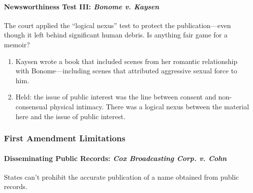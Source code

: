 \paragraph{Newsworthiness Test III: \emph{Bonome v. Kaysen}}

The court applied the ``logical nexus'' test to protect the publication---even 
though it left behind significant human debris. Is anything fair game for a 
memoir?

\begin{enumerate}
    \item Kaysen wrote a book that included scenes from her romantic 
    relationship with Bonome---including scenes that attributed aggressive 
    sexual force to him.
    \item Held: the issue of public interest was the line between consent and 
    non-consensual physical intimacy. There was a logical nexus between the 
    material here and the issue of public interest.
\end{enumerate}

\subsubsection{First Amendment Limitations}

\paragraph{Disseminating Public Records: \emph{Cox Broadcasting Corp. v. Cohn}}

States can't prohibit the accurate publication of a name obtained from public 
records.


